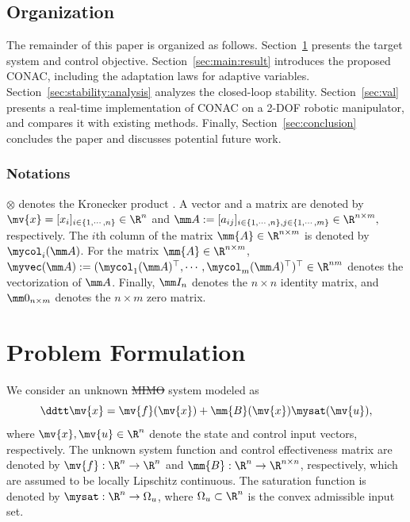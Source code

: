 \documentclass[letterpaper, journal, twoside]{IEEEtran}
\providecommand{\DIFadd}[1]{{\protect\color{blue}\uwave{#1}}} %
\providecommand{\DIFdel}[1]{{\protect\color{red}\sout{#1}}} %
\providecommand{\DIFaddbegin}{} %
\providecommand{\DIFaddend}{} %
\providecommand{\DIFdelbegin}{} %
\providecommand{\DIFdelend}{} %
\begin{document}
\subsection{Organization}

The remainder of this paper is organized as follows. 
Section~\ref{sec:problem:formulation} presents the target system and control objective.
Section~\ref{sec:main:result} introduces the proposed CONAC, including the adaptation laws for adaptive variables.
Section~\ref{sec:stability:analysis} analyzes the closed-loop stability.
Section~\ref{sec:val} presents a real-time implementation of CONAC on a 2-DOF robotic manipulator, and compares it with existing methods.
Finally, Section~\ref{sec:conclusion} concludes the paper and discusses potential future work.

\subsubsection*{Notations}

$\otimes$ denotes the Kronecker product \cite[Chap. 7, Def. 7.1.2]{Bernstein:2009aa}.
A vector and a matrix are denoted by $\mv{x}=[x_i]_{i\in\{1,\cdots,n\}}\in\R^n$ and 
$
  \mm A
  := 
  [a_{ij}]_{
    i\in\{1,\cdots,n\},j\in\{1,\cdots ,m\}
  }\in\R^{n\times m}
  ,
$
respectively.
The $i$th column of the matrix $\mm{A}\in\R^{n\times m}$ is denoted by $\mycol_i(\mm A)$.
For the matrix $\mm{A}\in\R^{n\times m}$, $\myvec(\mm A):=(\mycol_1(\mm A)^\top,\cdots,\mycol_m(\mm A)^\top )^\top\in\R^{nm}$ denotes the vectorization of $\mm A$.
Finally, $\mm I_n$ denotes the $n\times n$ identity matrix, and $\mm 0_{n\times m}$ denotes the $n\times m$ zero matrix.

\section{Problem Formulation} \label{sec:problem:formulation}

We consider an unknown \DIFdelbegin \DIFdel{MIMO }\DIFdelend \DIFaddbegin \DIFadd{multi-input multi-output (MIMO) }\DIFaddend system modeled as 
\begin{equation} \label{eq:sys}
  \ddtt\mv{x} 
  = 
  \mv{f}(\mv{x}) 
  + 
  \mm{B}(\mv{x})\mysat(\mv{u})
  ,
\end{equation}
where $\mv{x},\mv{u}\in\R^n$ denote the state and control input vectors, respectively.
The unknown system function and control effectiveness matrix are denoted by $\mv{f}:\R^n\to\R^n$ and $\mm{B}:\R^n\to\R^{n\times n}$, respectively, which are assumed to be locally Lipschitz continuous.
The saturation function is denoted by $\mysat:\R^n\to\Omega_u$, where $\Omega_u\subset\R^n$ is the convex admissible input set.
\end{document}
